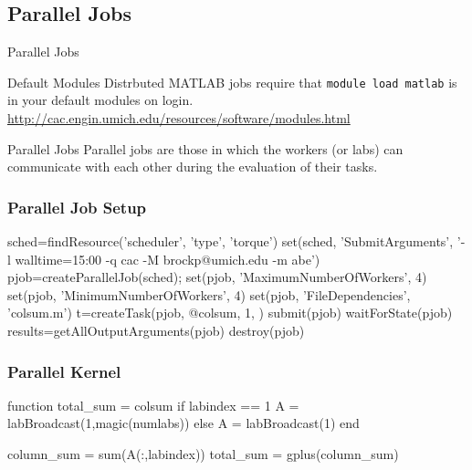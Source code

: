 \documentclass[handout]{beamer}
\begin{document}
   \subsection{Parallel Jobs}
   \begin{frame}{Parallel Jobs}
    \begin{block}{Default Modules}
     Distrbuted MATLAB jobs require that \texttt{module load matlab} is in your default modules on login. \\
\url{http://cac.engin.umich.edu/resources/software/modules.html}
    \end{block}
    \begin{block}{Parallel Jobs}
     Parallel jobs are those in which the workers (or labs) can communicate with each other during the evaluation of their tasks. 
    \end{block}
   \end{frame}
   
\begin{frame}[fragile]
\frametitle{Parallel Job Setup}
 \begin{semiverbatim}
sched=findResource('scheduler', 'type', 'torque')
set(sched, 'SubmitArguments', '-l walltime=15:00
             -q cac -M brockp@umich.edu -m abe')
pjob=createParallelJob(sched);
set(pjob, 'MaximumNumberOfWorkers', 4)
set(pjob, 'MinimumNumberOfWorkers', 4)
set(pjob, 'FileDependencies', {'colsum.m'})
t=createTask(pjob, @colsum, 1, {})
submit(pjob)
waitForState(pjob)
results=getAllOutputArguments(pjob)
destroy(pjob)
 \end{semiverbatim}
\end{frame}

\begin{frame}[fragile]
\frametitle{Parallel Kernel}
\begin{semiverbatim}
function total\_sum = colsum
if labindex == 1
  A = labBroadcast(1,magic(numlabs))
else
  A = labBroadcast(1)
end

column\_sum = sum(A(:,labindex))
total\_sum = gplus(column\_sum)
\end{semiverbatim}
\end{frame}
\end{document}
